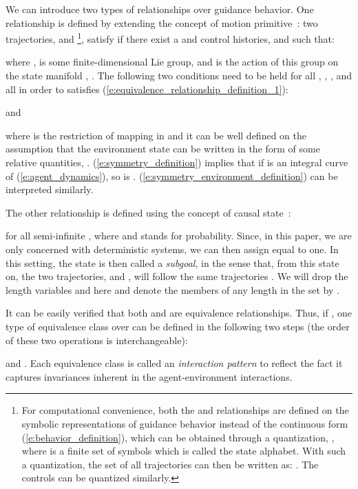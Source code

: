 \documentclass[journal]{IEEEtran}
\begin{document}
We can introduce two types of relationships over guidance behavior. One relationship  is defined by extending the concept of motion primitive~\cite{frazzoli2005maneuver}: two trajectories,  and \footnote{For computational convenience, both the  and  relationships are defined on the symbolic representations of guidance behavior instead of the continuous form (\ref{e:behavior_definition}), which can be obtained through a quantization, , where  is a finite set of symbols which is called the state alphabet. With such a quantization, the set of all trajectories can then be written as: . The controls can be quantized similarly.}, satisfy  if there exist a  and control histories,  and  such that:
 
where ,  is some finite-dimensional Lie group, and  is the action of this group  on the state manifold , . The following two conditions need to be held for all , , ,  and all  in order to satisfies (\ref{e:equivalence_relationship_definition_1}): 
 
and

 
where  is the restriction of mapping  in  and it can be well defined on the assumption that the environment state can be written in the form of some relative quantities, . (\ref{e:symmetry_definition}) implies that if  is an integral curve of (\ref{e:agent_dynamics}), so is . (\ref{e:symmetry_environment_definition}) can be interpreted similarly. 

The other relationship  is defined using the concept of causal state~\cite{shalizi2001computational}: 

for all semi-infinite , where  and  stands for probability. Since, in this paper, we are only concerned with deterministic systems, we can then assign  equal to one. In this setting, the state  is then called a \textit{subgoal}, in the sense that, from this state on, the two trajectories,  and , will follow the same trajectories . We will drop the length variables  and  here and denote the members of any length in the set  by . 

It can be easily verified that both  and  are equivalence relationships. Thus, if , one type of equivalence class over  can be defined in the following two steps (the order of these two operations is interchangeable): 

and 
. Each equivalence class  is called an \textit{interaction pattern} to reflect the fact it captures invariances inherent in the agent-environment interactions.
\end{document}
